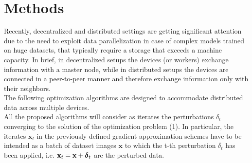 \section{Methods}
Recently, decentralized and distributed settings are getting significant attention due to the need to exploit data
parallelization in case of complex models trained on huge datasets, that typically require a storage that exceeds
a machine capacity. In brief, in decentralized setups the devices (or workers) exchange information with a master node, while in distributed setups the devices are connected in a peer-to-peer manner and therefore exchange information only with their neighbors. \\
\indent The following optimization algorithms are designed to accommodate distributed data across multiple devices.\\
\indent All the proposed algorithms will consider as iterates the perturbations \mbox{\boldmath$ \delta$}$_t$ converging to the solution of the optimization problem (1). In particular, the iterates $\mathbf{x}_t$ in the previously defined gradient approximation schemes have to be intended as a batch of dataset images $\mathbf{x}$ to which the t-th perturbation \mbox{\boldmath$ \delta$}$_t$ has been applied, i.e. $\mathbf{x}_t = \mathbf{x} + \mbox{\boldmath$ \delta$}_t$ are the perturbed data.